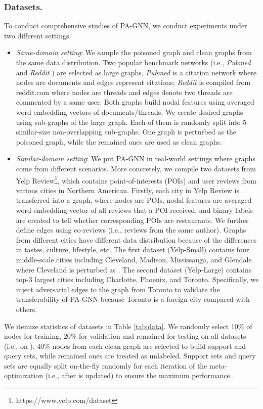 \documentclass[sigconf]{acmart}
\newcommand{\our}{{PA-GNN}\xspace}
\newcommand{\ours}{{PA-GNN}\xspace}
\begin{document}
\subsubsection{Datasets.}
To conduct comprehensive studies of \our, we conduct experiments under two different settings: 
\begin{itemize}[leftmargin=*]
    \item \textit{Same-domain setting}: We sample the poisoned graph and clean graphs from the same data distribution. Two popular benchmark networks (i.e., \textit{Pubmed} \cite{sen2008collective} and \textit{Reddit} \cite{hamilton2017inductive}) are selected as large graphs. 
    \textit{Pubmed} is a citation network where nodes are documents and edges represent citations; \textit{Reddit} is compiled from reddit.com where nodes are threads and edges denote two threads are commented by a same user. Both graphs build nodal features using averaged word embedding vectors \cite{pennington2014glove} of documents/threads.
    We create desired graphs using sub-graphs of the large graph. Each of them is randomly split into 5 similar-size non-overlapping sub-graphs. One graph is perturbed as the poisoned graph, while the remained ones are used as clean graphs. 
    
    \item \textit{Similar-domain setting}: We put \ours in real-world settings where graphs come from different scenarios. More concretely, we compile two datasets from Yelp Review\footnote{https://www.yelp.com/dataset}, which contains point-of-interests (POIs) and user reviews from various cities in Northern American. Firstly, each city in Yelp Review is transferred into a graph, where nodes are POIs, nodal features are averaged word-embedding vector \cite{pennington2014glove} of all reviews that a POI received, and binary labels are created to tell whether corresponding POIs are restaurants. We further define edges using co-reviews (i.e., reviews from the same author). 
    Graphs from different cities have different data distribution because of the differences in tastes, culture, lifestyle, etc.
    The first dataset (Yelp-Small) contains four middle-scale cities including Cleveland, Madison, Mississauga, and Glendale where Cleveland is perturbed as . The second dataset (Yelp-Large) contains top-3 largest cities including Charlotte, Phoenix, and Toronto. Specifically, we inject adversarial edges to the graph from Toronto to validate the transferability of \ours because Toronto is a foreign city compared with others.
\end{itemize}
We itemize statistics of datasets in Table \ref{tab:data}. We randomly select 10\% of nodes for training, 20\% for validation and remained for testing on all datasets (i.e., on ). 40\% nodes from each clean graph are selected to build support and query sets, while remained ones are treated as unlabeled. Support sets and query sets are equally split on-the-fly randomly for each iteration of the meta-optimization (i.e., after  is updated) to ensure the maximum performance.
\end{document}
